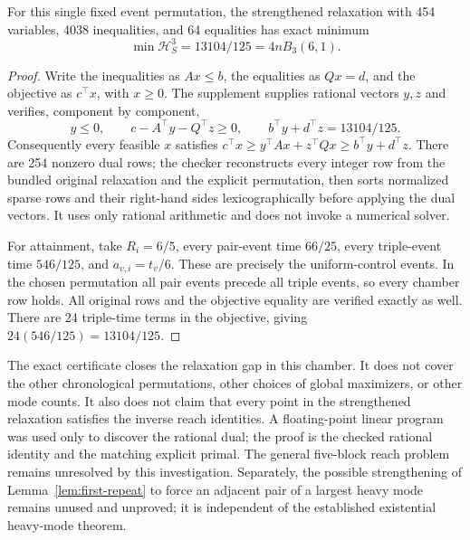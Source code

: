 \begin{proposition}
\label{prop:chronological-chamber}
For this single fixed event permutation, the strengthened relaxation with
454 variables, 4038 inequalities, and 64 equalities has exact minimum
\[
 \min\mathcal H_S^3=13104/125=4nB_3(6,1).
\]
\end{proposition}
\begin{proof}
Write the inequalities as $Ax\le b$, the equalities as $Qx=d$, and
the objective as $c^\top x$, with $x\ge0$. The supplement supplies
rational vectors $y,z$ and verifies, component by component,
\[
 y\le0,\qquad c-A^\top y-Q^\top z\ge0,\qquad
 b^\top y+d^\top z=13104/125.
\]
Consequently every feasible $x$ satisfies
$c^\top x\ge y^\top Ax+z^\top Qx\ge b^\top y+d^\top z$.
There are 254 nonzero dual rows; the checker reconstructs every integer
row from the bundled original relaxation and the explicit permutation,
then sorts normalized sparse rows and their right-hand sides
lexicographically before applying the dual vectors.
It uses only rational arithmetic and does not invoke a numerical solver.

For attainment, take $R_i=6/5$, every pair-event time $66/25$, every
triple-event time $546/125$, and $a_{v,i}=t_v/6$. These are precisely the
uniform-control events. In the chosen permutation all pair events precede
all triple events, so every chamber row holds. All original rows and the
objective equality are verified exactly as well. There are 24 triple-time
terms in the objective, giving $24(546/125)=13104/125$.
\end{proof}

The exact certificate closes the relaxation gap in this chamber. It does
not cover the other chronological permutations, other choices of global
maximizers, or other mode counts. It also does not claim that every point
in the strengthened relaxation satisfies the inverse reach identities.
A floating-point linear program was used only to discover the rational
dual; the proof is the checked rational identity and the matching explicit
primal. The general five-block reach problem remains unresolved by this
investigation. Separately, the possible strengthening of
Lemma~\ref{lem:first-repeat} to force an adjacent pair of a largest heavy
mode remains unused and unproved; it is independent of the established
existential heavy-mode theorem.
